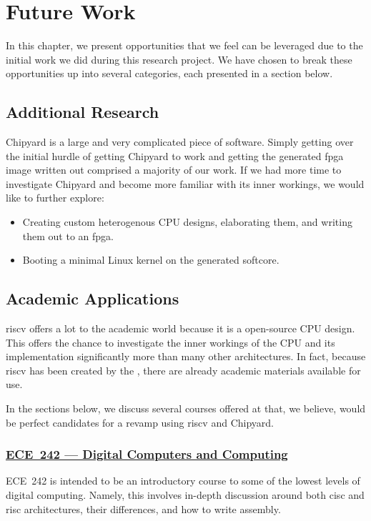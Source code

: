 \chapter{Future Work}\label{chap:Future_Work}
In this chapter, we present opportunities that we feel can be leveraged due to the initial work we did during this research project.
We have chosen to break these opportunities up into several categories, each presented in a section below.

\section{Additional Research}\label{sec:Additional_Research}
Chipyard is a large and very complicated piece of software.
Simply getting over the initial hurdle of getting Chipyard to work and getting the generated \Gls{fpga} image written out comprised a majority of our work.
If we had more time to investigate Chipyard and become more familiar with its inner workings, we would like to further explore:
\begin{itemize}
\item Creating custom heterogenous CPU designs, elaborating them, and writing them out to an \Gls{fpga}.
\item Booting a minimal Linux kernel on the generated \gls{softcore}.
\end{itemize}

\section{Academic Applications}\label{sec:Academic_Applications}
\Gls{riscv} offers a lot to the academic world because it is a open-source CPU design.
This offers the chance to investigate the inner workings of the CPU and its implementation significantly more than many other architectures.
In fact, because \Gls{riscv} has been created by the \UCB{}, there are already academic materials available for use.

In the sections below, we discuss several courses offered at \IIT{} that, we believe, would be perfect candidates for a revamp using \Gls{riscv} and Chipyard.

\subsection{\href{http://bulletin.iit.edu/search/?P=ECE 242}{ECE~242 --- Digital Computers and Computing}}\label{sec:ECE_242}
ECE~242 is intended to be an introductory course to some of the lowest levels of digital computing.
Namely, this involves in-depth discussion around both \Gls{cisc} and \Gls{risc} architectures, their differences, and how to write \gls{assembly}.

